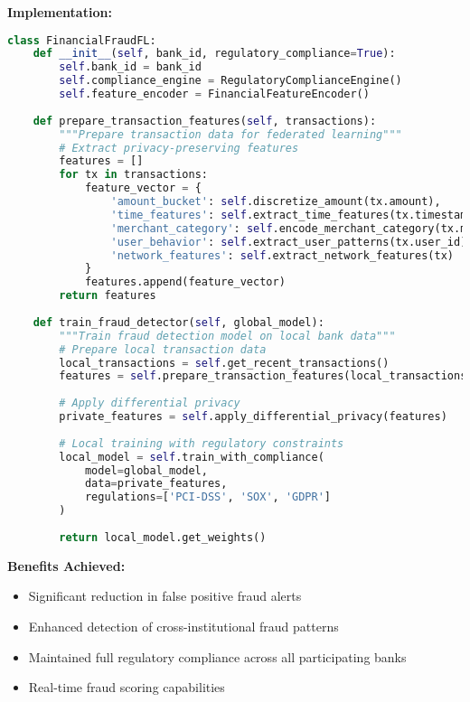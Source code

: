 \textbf{Implementation:}
\begin{lstlisting}[language=python, caption=Financial Services FL Configuration]
class FinancialFraudFL:
    def __init__(self, bank_id, regulatory_compliance=True):
        self.bank_id = bank_id
        self.compliance_engine = RegulatoryComplianceEngine()
        self.feature_encoder = FinancialFeatureEncoder()
        
    def prepare_transaction_features(self, transactions):
        """Prepare transaction data for federated learning"""
        # Extract privacy-preserving features
        features = []
        for tx in transactions:
            feature_vector = {
                'amount_bucket': self.discretize_amount(tx.amount),
                'time_features': self.extract_time_features(tx.timestamp),
                'merchant_category': self.encode_merchant_category(tx.merchant),
                'user_behavior': self.extract_user_patterns(tx.user_id),
                'network_features': self.extract_network_features(tx)
            }
            features.append(feature_vector)
        return features
        
    def train_fraud_detector(self, global_model):
        """Train fraud detection model on local bank data"""
        # Prepare local transaction data
        local_transactions = self.get_recent_transactions()
        features = self.prepare_transaction_features(local_transactions)
        
        # Apply differential privacy
        private_features = self.apply_differential_privacy(features)
        
        # Local training with regulatory constraints
        local_model = self.train_with_compliance(
            model=global_model,
            data=private_features,
            regulations=['PCI-DSS', 'SOX', 'GDPR']
        )
        
        return local_model.get_weights()
\end{lstlisting}

\textbf{Benefits Achieved:}
\begin{itemize}
    \item Significant reduction in false positive fraud alerts
    \item Enhanced detection of cross-institutional fraud patterns
    \item Maintained full regulatory compliance across all participating banks
    \item Real-time fraud scoring capabilities
\end{itemize}

